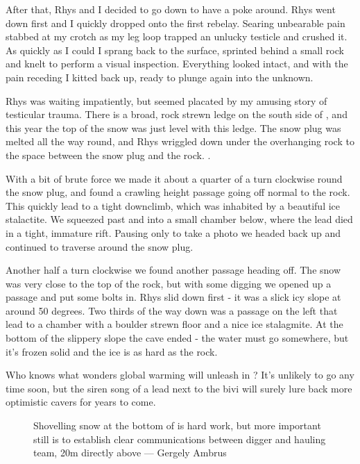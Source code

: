 After that, Rhys and I decided to go down to have a poke around. Rhys went down first and I quickly dropped onto the first rebelay. Searing unbearable pain stabbed at my crotch as my leg loop trapped an unlucky testicle and crushed it. As quickly as I could I sprang back to the surface, sprinted behind a small rock and knelt to perform a visual inspection. Everything looked intact, and with the pain receding I kitted back up, ready to plunge again into the unknown.


Rhys was waiting impatiently, but seemed placated by my amusing story of testicular trauma. There is a broad, rock strewn ledge on the south side of , and this year the top of the snow was just level with this ledge. The snow plug was melted all the way round, and Rhys wriggled down under the overhanging rock to the space between the snow plug and the rock. .

With a bit of brute force we made it about a quarter of a turn clockwise round the snow plug, and found a crawling height passage going off normal to the rock. This quickly lead to a tight downclimb, which was inhabited by a beautiful ice stalactite. We squeezed past and into a small chamber below, where the lead died in a tight, immature rift. Pausing only to take a photo we headed back up and continued to traverse around the snow plug.



Another half a turn clockwise we found another passage heading off. The snow was very close to the top of the rock, but with some digging we opened up a passage and put some bolts in. Rhys slid down first - it was a slick icy slope at around 50 degrees. Two thirds of the way down was a passage on the left that lead to a chamber with a boulder strewn floor and a nice ice stalagmite. At the bottom of the slippery slope the cave ended - the water must go somewhere, but it's frozen solid and the ice is as hard as the rock.



Who knows what wonders global warming will unleash in ? It's unlikely to go any time soon, but the siren song of a lead next to the bivi will surely lure back more optimistic cavers for years to come.

\begin{figure}[b!]
\checkoddpage \ifoddpage \forcerectofloat \else \forceversofloat \fi
\centering
{}
\caption{Shovelling snow at the bottom of \protect{} is hard work, but more important still is to establish clear communications between digger and hauling team, 20m directly above --- Gergely Ambrus}
\label{bottom of M10}
\end{figure}

